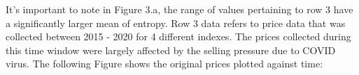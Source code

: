 \documentclass{article}[12pt]
\begin{document}
                    It's important to note in Figure 3.a, the range of values pertaining to row 3 have a significantly larger mean of entropy. Row 3 data refers to price data that was collected between 2015 - 2020 for 4 different indexes. The prices collected during this time window were largely affected by the selling pressure due to COVID virus. The following Figure shows the original prices plotted against time:

                    \begin{figure}[htbp]
                      \centering
                      \hfill
                      \caption{}
                    \end{figure}
\end{document}
